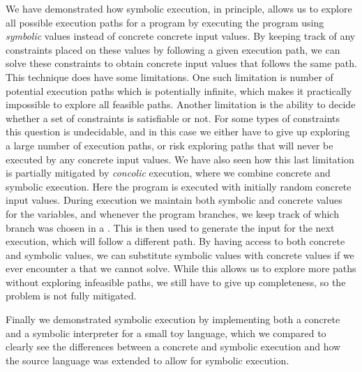 
We have demonstrated how symbolic execution, in principle, allows us to explore all possible execution paths for a program by executing the program using \emph{symbolic} values instead of concrete concrete input values. By keeping track of any constraints placed on these values by following a given execution path, we can solve these constraints to obtain concrete input values that follows the same path. This technique does have some limitations. One such limitation is number of potential execution paths which is potentially infinite, which makes it practically impossible to explore all feasible paths. Another limitation is the ability to decide whether a set of constraints is satisfiable or not. For some types of constraints this question is undecidable, and in this case we either have to give up exploring a large number of execution paths, or risk exploring paths that will never be executed by any concrete input values. We have also seen how this last limitation is partially mitigated by \emph{concolic} execution, where we combine concrete and symbolic execution. Here the program is executed with initially random concrete input values. During execution we maintain both symbolic and concrete values for the variables, and whenever the program branches, we keep track of which branch was chosen in a \pc. This \pc is then used to generate the input for the next execution, which will follow a different path. By having access to both concrete and symbolic values, we can substitute symbolic values with concrete values if we ever encounter a \pc that we cannot solve. While this allows us to explore more paths without exploring infeasible paths, we still have to give up completeness, so the problem is not fully mitigated.

\noindent Finally we demonstrated symbolic execution by implementing both a concrete and a symbolic interpreter for a small toy language, which we compared to clearly see the differences between a concrete and symbolic execution and how the source language was extended to allow for symbolic execution. 
